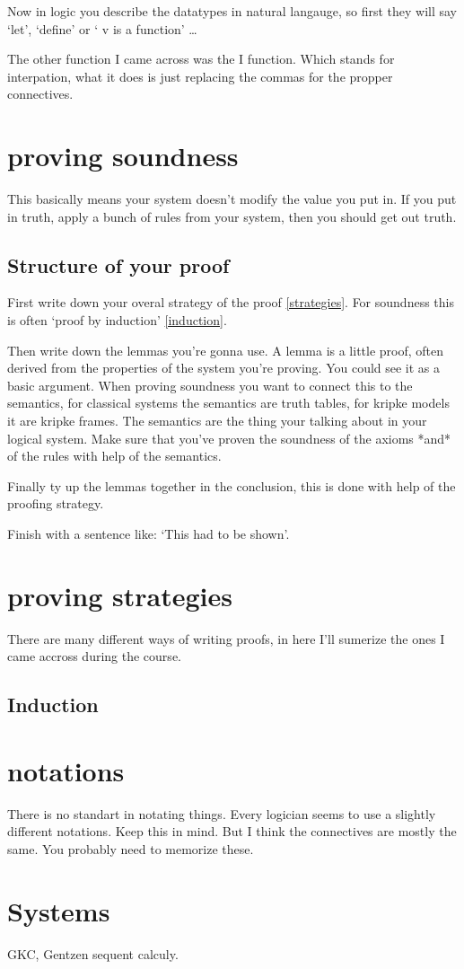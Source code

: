 \documentclass{article}
\begin{document}
Now in logic you describe the datatypes in natural langauge, so first they will
say `let', `define' or ` v is a function' \ldots

The other function I came across was the I function. Which stands for 
interpation, what it does is just replacing the commas for the propper
connectives.

\section{proving soundness}
This basically means your system doesn't modify the value you put in.
If you put in truth, apply a bunch of rules from your system, then you should
get out truth.

\subsection{Structure of your proof}
First write down your overal strategy of the proof \autoref{strategies}. For
soundness this is often `proof by induction' \autoref{induction}.

Then write down the lemmas you're gonna use. A lemma is a little proof, often
derived from the properties of the system you're proving. You could see it
as a basic argument. When proving soundness you want to connect this to the
semantics, for classical systems the semantics are truth tables, for kripke
models it are kripke frames. The semantics are the thing your talking about
in your logical system.
Make sure that you've proven the soundness of the axioms *and* of the rules
with help of the semantics.

Finally ty up the lemmas together in the conclusion, this is done with help
of the proofing strategy.

Finish with a sentence like: `This had to be shown'.

\section{proving strategies}
\label{strategies}
There are many different ways of writing proofs, in here I'll sumerize the ones
I came accross during the course.

\subsection{Induction}
\label{induction}


\section{notations}
\label{notations}
There is no standart in notating things. Every logician seems to use a
slightly different notations. Keep this in mind. But I think the connectives
are mostly the same. You probably need to memorize these.

\section{Systems}
GKC, Gentzen sequent calculy.
\end{document}
